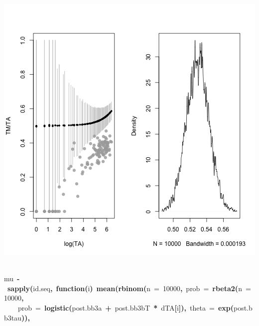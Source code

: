 \documentclass{article}
\makeatletter
\newcommand{\hlnumber}[1]{\textcolor[rgb]{0,0,0}{#1}}%
\newcommand{\hlfunctioncall}[1]{\textcolor[rgb]{.5,0,.33}{\textbf{#1}}}%
\newcommand{\hlkeyword}[1]{\textbf{#1}}%
\newcommand{\hlargument}[1]{\textcolor[rgb]{.69,.25,.02}{#1}}%
\newcommand{\hlformalargs}[1]{\hlargument{#1}}%
\newcommand{\hlassignement}[1]{\textbf{#1}}%
\newcommand{\hlsymbol}[1]{#1}%
\newcommand{\hlstd}[1]{\textcolor[rgb]{0,0,0}{#1}}%
\newenvironment{kframe}{%
 \def\FrameCommand##1{\hskip\@totalleftmargin \hskip-\fboxsep
 \colorbox{shadecolor}{##1}\hskip-\fboxsep
     \hskip-\linewidth \hskip-\@totalleftmargin \hskip\columnwidth}%
 \MakeFramed {\advance\hsize-\width
   \@totalleftmargin\z@ \linewidth\hsize
   \@setminipage}}%
 {\par\unskip\endMakeFramed}
\newenvironment{knitrout}{}{} %
\makeatother
\begin{document}
\begin{knitrout}
{\begin{kframe}
\includegraphics{post-bs-threes1} \begin{flushleft}
\ttfamily\noindent
\hspace*{\fill}\\
\hlstd{}\hlsymbol{mu}{\ }\hlassignement{\usebox{\hlnormalsizeboxlessthan}-}{\ }\hlfunctioncall{sapply}\hlkeyword{(}\hlsymbol{id.seq}\hlkeyword{,}{\ }\hlkeyword{function}\hlkeyword{(}\hlformalargs{i}\hlkeyword{)}{\ }\hlfunctioncall{mean}\hlkeyword{(}\hlfunctioncall{rbinom}\hlkeyword{(}\hlargument{n}{\ }\hlargument{=}{\ }\hlnumber{10000}\hlkeyword{,}{\ }\hlargument{prob}{\ }\hlargument{=}{\ }\hlfunctioncall{rbeta2}\hlkeyword{(}\hlargument{n}{\ }\hlargument{=}{\ }\hlnumber{10000}\hlkeyword{,}\hspace*{\fill}\\
\hlstd{}{\ }{\ }{\ }{\ }\hlargument{prob}{\ }\hlargument{=}{\ }\hlfunctioncall{logistic}\hlkeyword{(}\hlsymbol{post.bb3}\hlkeyword{\usebox{\hlnormalsizeboxdollar}}\hlsymbol{a}{\ }\hlkeyword{+}{\ }\hlsymbol{post.bb3}\hlkeyword{\usebox{\hlnormalsizeboxdollar}}\hlsymbol{bT}{\ }\hlkeyword{*}{\ }\hlsymbol{d}\hlkeyword{\usebox{\hlnormalsizeboxdollar}}\hlsymbol{TA}\hlkeyword{[}\hlsymbol{i}\hlkeyword{]}\hlkeyword{)}\hlkeyword{,}{\ }\hlargument{theta}{\ }\hlargument{=}{\ }\hlfunctioncall{exp}\hlkeyword{(}\hlsymbol{post.bb3}\hlkeyword{\usebox{\hlnormalsizeboxdollar}}\hlsymbol{tau}\hlkeyword{)}\hlkeyword{)}\hlkeyword{,}\hspace*{\fill}\\

\end{flushleft}
\end{kframe}}
\end{knitrout}
\end{document}
